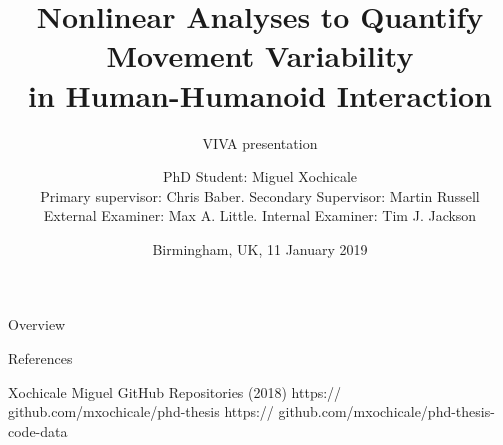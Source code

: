 \documentclass[compress]{beamer}
\title{
	Nonlinear Analyses to Quantify \\
	Movement Variability \\ 
	in Human-Humanoid Interaction}
\subtitle{VIVA presentation}
\date{Birmingham, UK, 11 January 2019}
\author{PhD Student: Miguel Xochicale \\
	Primary supervisor: Chris Baber. Secondary Supervisor: Martin Russell\\
	External Examiner: Max A. Little. Internal Examiner: Tim J. Jackson
}
\institute{School of Engineering \\{\bf University of Birmingham, UK}}
\begin{document}


\maketitle


\subsection{}
{
\begin{frame}{Overview}


    \begin{figure}
   \end{figure}
\end{frame}
}















\begin{frame}{References}
    \begin{thebibliography}{10}

\beamertemplatearticlebibitems

      Xochicale Miguel
      \newblock {}
      \newblock GitHub Repositories (2018) 
      \newblock https:// github.com/mxochicale/phd-thesis 
      \newblock https:// github.com/mxochicale/phd-thesis-code-data 

    \end{thebibliography}
\end{frame}



\end{document}
